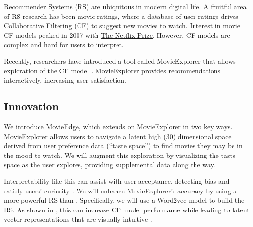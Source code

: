 Recommender Systems (RS) are ubiquitous in modern digital life. A fruitful area of RS research has been movie ratings, where a database of user ratings drives Collaborative Filtering (CF) to suggest new movies to watch. Interest in movie CF models peaked in 2007 with \href{https://www.netflixprize.com/}{The Netflix Prize}. However, CF models are complex and hard for users to interpret.

Recently, researchers have introduced a tool called MovieExplorer that allows exploration of the CF model \cite{taijala2018movieexplorer}. MovieExplorer provides recommendations interactively, increasing user satisfaction.

\subsection{Innovation}

We introduce MovieEdge, which extends on MovieExplorer in two key ways. MovieExplorer allows users to navigate a latent high (30) dimensional space derived from user preference data (“taste space”) to find movies they may be in the mood to watch. We will augment this exploration by visualizing the taste space as the user explores, providing supplemental data along the way.

Interpretability like this can assist with user acceptance, detecting bias and satisfy users’ curiosity \cite{Molnar2019interpretable}. We will enhance MovieExplorer’s accuracy  by using a more powerful RS than \cite{taijala2018movieexplorer}. Specifically, we will use a Word2vec model \cite{mikolov2013distributed} to build the RS. As shown in \cite{ozsoy2016word}, this can increase CF model performance while leading to latent vector representations that are visually intuitive \cite{mikolov2013distributed}. 